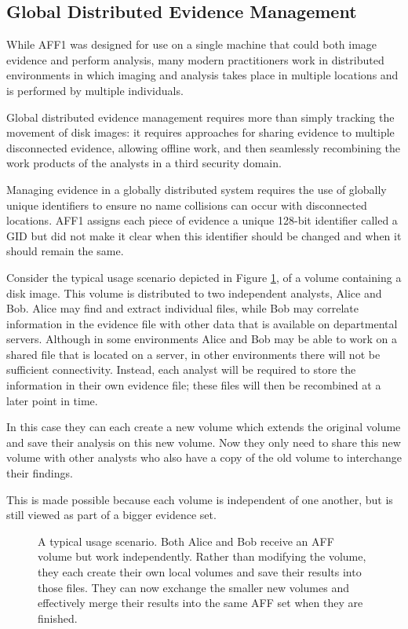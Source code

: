 \documentclass[10pt, conference]{IEEEtran}
\begin{document}
\subsection{Global Distributed Evidence Management}
While AFF1 was designed for use on a single machine that could both
image evidence and perform analysis, many modern practitioners work in
distributed environments in which imaging and analysis takes place in
multiple locations and is performed by multiple individuals. 


Global distributed evidence management requires more than simply
tracking the movement of disk images: it requires approaches for
sharing evidence to multiple disconnected evidence, allowing offline
work, and then seamlessly recombining the work products of the
analysts in a third security domain.

Managing evidence in a globally distributed system requires the use of
globally unique identifiers to ensure no name collisions can occur
with disconnected locations. AFF1 assigns each piece of evidence a
unique 128-bit identifier called a GID but did not make it clear when
this identifier should be changed and when it should remain the same.

Consider the typical usage scenario depicted in Figure \ref{usage}, of
a volume containing a disk image. This volume is distributed to two
independent analysts, Alice and Bob. Alice may find and extract
individual files, while Bob may correlate information in the evidence
file with other data that is available on departmental
servers. Although in some environments Alice and Bob may be able to
work on a shared file that is located on a server, in other
environments there will not be sufficient connectivity. Instead, each
analyst will be required to store the information in their own
evidence file; these files will then be recombined at a later point in
time.

In this case they can each create a new volume which extends the
original volume and save their analysis on this new volume. Now they
only need to share this new volume with other analysts who also have a
copy of the old volume to interchange their findings.

This is made possible because each volume is independent of one
another, but is still viewed as part of a bigger evidence set.

\begin{figure}[tb]
  \begin{center}
  \mbox{\columnwidth {}}
  \caption{A typical usage scenario. Both Alice and Bob receive an AFF
  volume but work independently. Rather than modifying the volume,
  they each create their own local volumes and save their results into
  those files. They can now exchange the smaller new volumes and
  effectively merge their results into the same AFF set when they are finished.}
  \label{usage}
  \end{center}
\end{figure}
\end{document}

